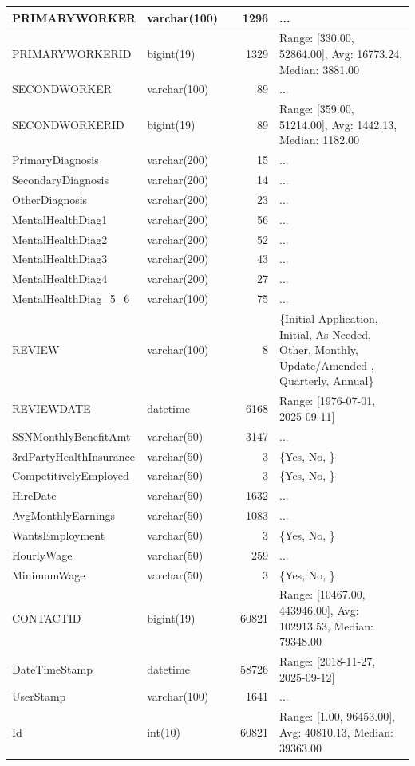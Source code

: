 \begin{landscape}
\begin{longtable}{|l|l|l|r|p{6cm}|}
\hline
PRIMARYWORKER & varchar(100) &  & 1296 & ... \\
\hline
PRIMARYWORKERID & bigint(19) &  & 1329 & Range: [330.00, 52864.00], Avg: 16773.24, Median: 3881.00 \\
\hline
SECONDWORKER & varchar(100) &  & 89 & ... \\
\hline
SECONDWORKERID & bigint(19) &  & 89 & Range: [359.00, 51214.00], Avg: 1442.13, Median: 1182.00 \\
\hline
PrimaryDiagnosis & varchar(200) &  & 15 & ... \\
\hline
SecondaryDiagnosis & varchar(200) &  & 14 & ... \\
\hline
OtherDiagnosis & varchar(200) &  & 23 & ... \\
\hline
MentalHealthDiag1 & varchar(200) &  & 56 & ... \\
\hline
MentalHealthDiag2 & varchar(200) &  & 52 & ... \\
\hline
MentalHealthDiag3 & varchar(200) &  & 43 & ... \\
\hline
MentalHealthDiag4 & varchar(200) &  & 27 & ... \\
\hline
MentalHealthDiag\_5\_6 & varchar(100) &  & 75 & ... \\
\hline
REVIEW & varchar(100) &  & 8 & \{Initial Application, Initial, As Needed, Other, Monthly, Update/Amended , Quarterly, Annual\} \\
\hline
REVIEWDATE & datetime &  & 6168 & Range: [1976-07-01, 2025-09-11] \\
\hline
SSNMonthlyBenefitAmt & varchar(50) &  & 3147 & ... \\
\hline
3rdPartyHealthInsurance & varchar(50) &  & 3 & \{Yes, No, \} \\
\hline
CompetitivelyEmployed & varchar(50) &  & 3 & \{Yes, No, \} \\
\hline
HireDate & varchar(50) &  & 1632 & ... \\
\hline
AvgMonthlyEarnings & varchar(50) &  & 1083 & ... \\
\hline
WantsEmployment & varchar(50) &  & 3 & \{Yes, No, \} \\
\hline
HourlyWage & varchar(50) &  & 259 & ... \\
\hline
MinimumWage & varchar(50) &  & 3 & \{Yes, No, \} \\
\hline
CONTACTID & bigint(19) &  & 60821 & Range: [10467.00, 443946.00], Avg: 102913.53, Median: 79348.00 \\
\hline
DateTimeStamp & datetime &  & 58726 & Range: [2018-11-27, 2025-09-12] \\
\hline
UserStamp & varchar(100) &  & 1641 & ... \\
\hline
Id & int(10) &  & 60821 & Range: [1.00, 96453.00], Avg: 40810.13, Median: 39363.00 \\
\hline
\end{longtable}


\end{landscape}
